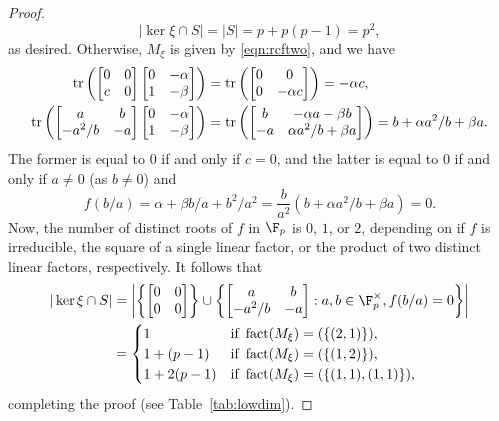 \begin{proof}
\begin{equation*}
|\ker\xi\cap S|=|S|=p+p(p-1)=p^2,
\end{equation*}
as desired. Otherwise, $M_\xi$ is given by \eqref{eqn:rcftwo}, and we have
\begin{equation}
\label{eqn:linrels}
\begin{split}
\operatorname{tr}\left(
\begin{bmatrix}
0&0\\
c&0
\end{bmatrix}
\begin{bmatrix}
0&-\alpha\\
1&-\beta
\end{bmatrix}\right)
&=
\operatorname{tr}\left(
\begin{bmatrix}
0&0\\
0&-\alpha c
\end{bmatrix}\right)
=-\alpha c,\\
\operatorname{tr}\left(
\begin{bmatrix}
a&b\\
-a^2/b&-a
\end{bmatrix}
\begin{bmatrix}
0&-\alpha\\
1&-\beta
\end{bmatrix}\right)
&=
\operatorname{tr}\left(
\begin{bmatrix}
b&-\alpha a-\beta b\\
-a&\alpha a^2/b+\beta a
\end{bmatrix}\right)
=b+\alpha a^2/b+\beta a.
\end{split}
\end{equation}
The former is equal to $0$ if and only if $c=0$, and the latter is equal to $0$ if and only if $a\ne 0$ (as $b\ne 0$) and
\begin{equation*}
f(b/a)=\alpha+\beta b/a+b^2/a^2=\frac{b}{a^2}(b+\alpha a^2/b+\beta a)=0.
\end{equation*}
Now, the number of distinct roots of $f$ in $\F_p$ is $0$, $1$, or $2$, depending on if $f$ is irreducible, the square of a single linear factor, or the product of two distinct linear factors, respectively. It follows that
\begin{align*}
|\ker\xi\cap S|&=\left|\left\{\begin{bmatrix}
0&0\\
0&0
\end{bmatrix}\right\}\cup
\left\{\begin{bmatrix}
a&b\\
-a^2/b&-a
\end{bmatrix}
:a,b\in\F_p^\times, f(b/a)=0\right\}\right|\\
&=\begin{cases}
1&\text{if }\fact(M_\xi)=(\{(2,1)\}),\\
1+(p-1)&\text{if }\fact(M_\xi)=(\{(1,2)\}),\\
1+2(p-1)&\text{if }\fact(M_\xi)=(\{(1,1),(1,1)\}),
\end{cases}
\end{align*}
completing the proof (see Table~\ref{tab:lowdim}).
\end{proof}
